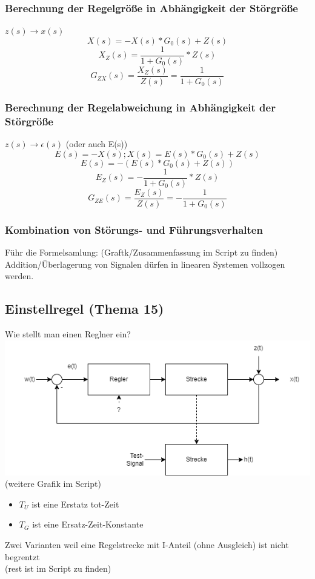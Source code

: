 \documentclass{article}
\begin{document}
\subsubsection*{Berechnung der Regelgröße in Abhängigkeit der Störgröße}
$z(s) \rightarrow x(s)$
\[
X(s)=-X(s)*G_0(s)+Z(s)
\]
\[
X_Z(s)=\frac{1}{1+G_0(s)}*Z(s)
\]
\[
G_{ZX}(s)=\frac{X_Z(s)}{Z(s)}=\frac{1}{1+G_0(s)}
\]

\subsubsection*{Berechnung der Regelabweichung in Abhängigkeit der Störgröße}
$z(s) \rightarrow \epsilon(s)$ (oder auch E(s))
\[
E(s)=-X(s); X(s) = E(s) * G_0(s)+Z(s)
\]
\[
E(s)=-(E(s)*G_0(s)+Z(s))
\]
\[
E_Z(s)=-\frac{1}{1+G_0(s)}*Z(s)
\]
\[
G_{ZE}(s)=\frac{E_Z(s)}{Z(s)}=-\frac{1}{1+G_0(s)}
\]

\subsubsection*{Kombination von Störungs- und Führungsverhalten}
Führ die Formelsamlung: (Graftk/Zusammenfassung im Script zu finden) \\
Addition/Überlagerung von Signalen dürfen in linearen Systemen vollzogen werden.


\subsection*{Einstellregel (Thema 15)}
Wie stellt man einen Reglner ein? \\
\includegraphics[width=\textwidth]{2024_11_21_Wie_stelle_ich_einen_Regler_ein.png}
(weitere Grafik im Script)\\
\begin{itemize}
	\item $T_U$ ist eine Erstatz tot-Zeit
	\item $T_G$ ist eine Ersatz-Zeit-Konstante
\end{itemize}
Zwei Varianten weil eine Regelstrecke mit I-Anteil (ohne Ausgleich) ist nicht begrentzt \\
(rest ist im Script zu finden)
\end{document}
